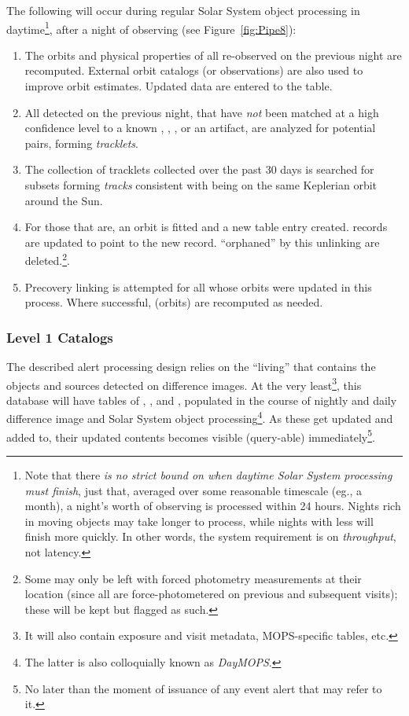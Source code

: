 The following will occur during regular Solar System object processing in daytime\footnote{Note that there {\em is no strict bound on when daytime Solar System processing must finish}, just that, averaged over some reasonable timescale (eg., a month), a night's worth of observing is processed within 24 hours. Nights rich in moving objects may take longer to process, while nights with less will finish more quickly. In other words, the system requirement is on {\em throughput}, not latency.}, after a night of observing (see Figure~\ref{fig:Pipe8}):
\begin{enumerate}
\item The orbits and physical properties of all \SSObjects re-observed on the previous night are recomputed. External orbit catalogs (or observations) are also used to improve orbit estimates. Updated data are entered to the \SSObjects table.
\item All \DIASources detected on the previous night, that have {\em not} been matched at a high confidence level to a known \Object,
\DIAObject, \SSObject, or an artifact, are analyzed for potential pairs, forming {\em tracklets}.
\item The collection of tracklets collected over the past 30 days is searched for subsets forming {\em tracks} consistent with being on the same Keplerian orbit around the Sun.
\item For those that are, an orbit is fitted and a new \SSObject table entry created. \DIASource records are updated to point to the new \SSObject record. \DIAObjects ``orphaned'' by this unlinking are deleted.\footnote{Some \DIAObjects may only be left with forced photometry measurements at their location (since all \DIAObjects are force-photometered on previous and subsequent visits);  these will be kept but flagged as such.}.
\item Precovery linking is attempted for all \SSObjects whose orbits were updated in this process. Where successful, \SSObjects (orbits) are recomputed as needed.
\end{enumerate}


\subsubsection{Level 1 Catalogs}
\label{sec:level1db}

The described alert processing design relies on the ``living'' \DB that contains the objects and sources detected on difference images. At the very least\footnote{It will also contain exposure and visit metadata, MOPS-specific tables, etc.}, this database will have tables of \DIASources, \DIAObjects, and \SSObjects, populated in the course of nightly and daily difference image and Solar System object processing\footnote{The latter is also colloquially known as {\em DayMOPS}.}. As these get updated and added to, their updated contents becomes visible (query-able) immediately\footnote{No later than the moment of issuance of any event alert that may refer to it.}.


